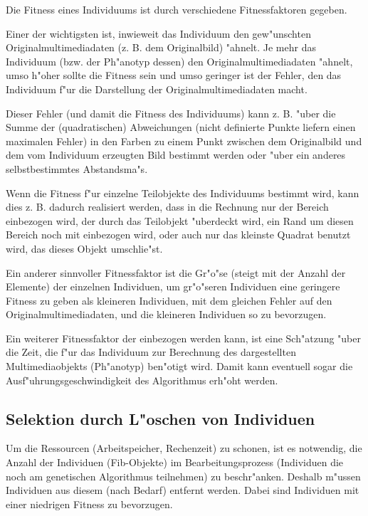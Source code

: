Die Fitness eines Individuums ist durch verschiedene Fitnessfaktoren gegeben.

Einer der wichtigsten ist, inwieweit das Individuum den gew"unschten Originalmultimediadaten (z. B. dem Originalbild) "ahnelt. Je mehr das Individuum (bzw. der Ph"anotyp dessen) den Originalmultimediadaten "ahnelt, umso h"oher sollte die Fitness sein und umso geringer ist der Fehler, den das Individuum f"ur die Darstellung der Originalmultimediadaten macht.

Dieser Fehler (und damit die Fitness des Individuums) kann z. B. "uber die Summe der (quadratischen) Abweichungen (nicht definierte Punkte liefern einen maximalen Fehler) in den Farben zu einem Punkt zwischen dem Originalbild und dem vom Individuum erzeugten Bild bestimmt werden oder "uber ein anderes selbstbestimmtes Abstandsma"s.

Wenn die Fitness f"ur einzelne Teilobjekte des Individuums bestimmt wird, kann dies z. B. dadurch realisiert werden, dass in die Rechnung nur der Bereich einbezogen wird, der durch das Teilobjekt "uberdeckt wird, ein Rand um diesen Bereich noch mit einbezogen wird, oder auch nur das kleinste Quadrat benutzt wird, das dieses Objekt umschlie"st.

Ein anderer sinnvoller Fitnessfaktor ist die Gr"o"se (steigt mit der Anzahl der Elemente) der einzelnen Individuen, um gr"o"seren Individuen eine geringere Fitness zu geben als kleineren Individuen, mit dem gleichen Fehler auf den Originalmultimediadaten, und die kleineren Individuen so zu bevorzugen.

Ein weiterer Fitnessfaktor der einbezogen werden kann, ist eine Sch"atzung "uber die Zeit, die f"ur das Individuum zur Berechnung des dargestellten Multimediaobjekts (Ph"anotyp) ben"otigt wird. Damit kann eventuell sogar die Ausf"uhrungsgeschwindigkeit des Algorithmus erh"oht werden.


\subsection{Selektion durch L"oschen von Individuen}

Um die Ressourcen (Arbeitspeicher, Rechenzeit) zu schonen, ist es notwendig, die Anzahl der Individuen (Fib-Objekte) im Bearbeitungsprozess (Individuen die noch am genetischen Algorithmus teilnehmen) zu beschr"anken. Deshalb m"ussen Individuen aus diesem (nach Bedarf) entfernt werden. Dabei sind Individuen mit einer niedrigen Fitness zu bevorzugen.

